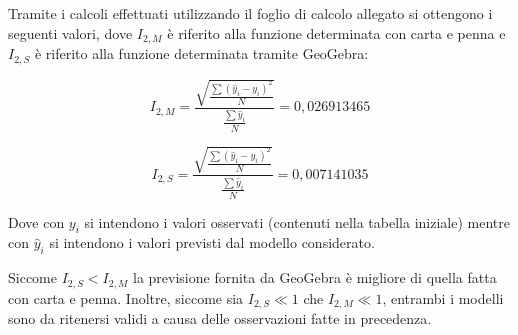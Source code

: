 \documentclass{article}     %
\begin{document}
    Tramite i calcoli effettuati utilizzando il foglio di calcolo allegato si ottengono i seguenti valori, dove $I_{2,M}$ è riferito alla funzione determinata con carta e penna e $I_{2,S}$ è riferito alla funzione determinata tramite GeoGebra:
    
    \[I_{2,M}=\frac{\sqrt{\frac{\sum(\hat{y}_i-y_i)^2}{N}}}{\frac{\sum\hat{y}_i}{N}} = 0,026913465\]
    
    \[I_{2,S}=\frac{\sqrt{\frac{\sum(\hat{y}_i-y_i)^2}{N}}}{\frac{\sum\hat{y}_i}{N}} = 0,007141035\]
    
    Dove con $y_i$ si intendono i valori osservati (contenuti nella tabella iniziale) mentre con $\hat{y}_i$ si intendono i valori previsti dal modello considerato.
    
    Siccome $I_{2,S} < I_{2,M}$ la previsione fornita da GeoGebra è migliore di quella fatta con carta e penna. Inoltre, siccome sia $I_{2,S} \ll 1$ che $I_{2,M} \ll 1$, entrambi i modelli sono da ritenersi validi a causa delle osservazioni fatte in precedenza.
\end{document}
